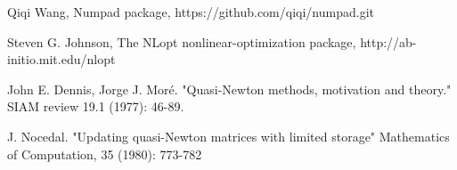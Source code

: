 \documentclass[a4paper,onecolumn]{article}
\theoremstyle{remark}
\begin{document}
\begin{thebibliography}{9}
%
%
%

%
Qiqi Wang,
Numpad package,
https://github.com/qiqi/numpad.git


%
Steven G. Johnson,
The NLopt nonlinear-optimization package, 
http://ab-initio.mit.edu/nlopt

%
John E. Dennis, Jorge J. Moré.
"Quasi-Newton methods, motivation and theory." SIAM review 19.1 (1977): 46-89.


%
J. Nocedal.
"Updating quasi-Newton matrices with limited storage"
Mathematics of Computation, 35 (1980): 773-782

%
%
%
%


\end{thebibliography}
\end{document}
